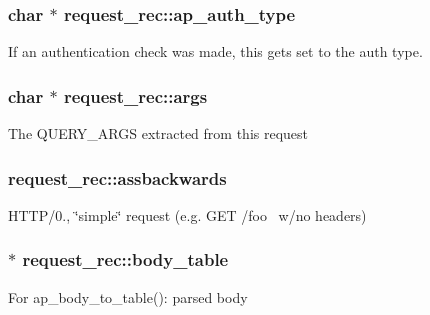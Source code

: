 \subsubsection[{\texorpdfstring{ap\+\_\+auth\+\_\+type}{ap_auth_type}}]{\setlength{\rightskip}{0pt plus 5cm}char $\ast$ request\+\_\+rec\+::ap\+\_\+auth\+\_\+type}\hypertarget{structrequest__rec_abda2941f76a54d63fa05d5d5b7a42a87}{}\label{structrequest__rec_abda2941f76a54d63fa05d5d5b7a42a87}
If an authentication check was made, this gets set to the auth type. 
\subsubsection[{\texorpdfstring{args}{args}}]{\setlength{\rightskip}{0pt plus 5cm}char $\ast$ request\+\_\+rec\+::args}\hypertarget{structrequest__rec_ad05e275008cdfe1865e02e8774541611}{}\label{structrequest__rec_ad05e275008cdfe1865e02e8774541611}
The Q\+U\+E\+R\+Y\+\_\+\+A\+R\+GS extracted from this request 
\subsubsection[{\texorpdfstring{assbackwards}{assbackwards}}]{ request\+\_\+rec\+::assbackwards}\hypertarget{structrequest__rec_a3539d3f9c5cc4785e0d805fd8aff7145}{}\label{structrequest__rec_a3539d3f9c5cc4785e0d805fd8aff7145}
H\+T\+T\+P/0., \char`\"{}simple\char`\"{} request (e.\+g. G\+ET /foo~\newline
 w/no headers) 
\subsubsection[{\texorpdfstring{body\+\_\+table}{body_table}}]{$\ast$ request\+\_\+rec\+::body\+\_\+table}\hypertarget{structrequest__rec_a284246e22b93f5a15d3ce27861b785f9}{}\label{structrequest__rec_a284246e22b93f5a15d3ce27861b785f9}
For ap\+\_\+body\+\_\+to\+\_\+table()\+: parsed body 
